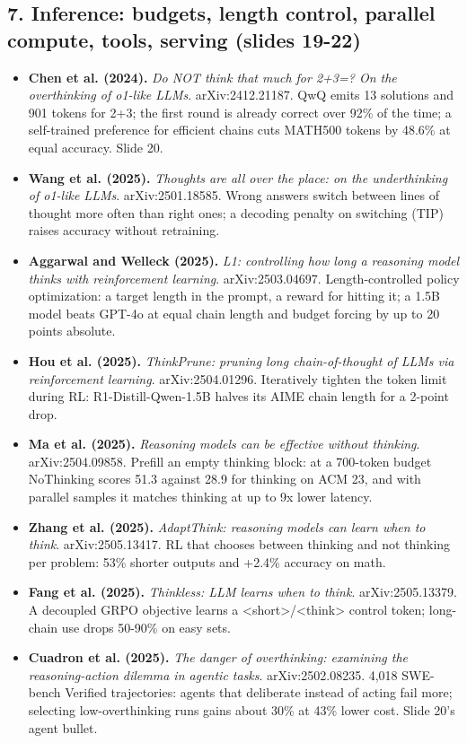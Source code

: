 \documentclass[11pt,letterpaper]{article}
\begin{document}
\subsection*{7. Inference: budgets, length control, parallel compute, tools, serving (slides 19-22)}
\begin{itemize}[leftmargin=1.2em,itemsep=3pt]\sloppy
\item \textbf{Chen et al. (2024).} \textit{Do NOT think that much for 2+3=? On the overthinking of o1-like LLMs}. arXiv:2412.21187. QwQ emits 13 solutions and 901 tokens for 2+3; the first round is already correct over 92\% of the time; a self-trained preference for efficient chains cuts MATH500 tokens by 48.6\% at equal accuracy. Slide 20.
\item \textbf{Wang et al. (2025).} \textit{Thoughts are all over the place: on the underthinking of o1-like LLMs}. arXiv:2501.18585. Wrong answers switch between lines of thought more often than right ones; a decoding penalty on switching (TIP) raises accuracy without retraining.
\item \textbf{Aggarwal and Welleck (2025).} \textit{L1: controlling how long a reasoning model thinks with reinforcement learning}. arXiv:2503.04697. Length-controlled policy optimization: a target length in the prompt, a reward for hitting it; a 1.5B model beats GPT-4o at equal chain length and budget forcing by up to 20 points absolute.
\item \textbf{Hou et al. (2025).} \textit{ThinkPrune: pruning long chain-of-thought of LLMs via reinforcement learning}. arXiv:2504.01296. Iteratively tighten the token limit during RL: R1-Distill-Qwen-1.5B halves its AIME chain length for a 2-point drop.
\item \textbf{Ma et al. (2025).} \textit{Reasoning models can be effective without thinking}. arXiv:2504.09858. Prefill an empty thinking block: at a 700-token budget NoThinking scores 51.3 against 28.9 for thinking on ACM 23, and with parallel samples it matches thinking at up to 9x lower latency.
\item \textbf{Zhang et al. (2025).} \textit{AdaptThink: reasoning models can learn when to think}. arXiv:2505.13417. RL that chooses between thinking and not thinking per problem: 53\% shorter outputs and +2.4\% accuracy on math.
\item \textbf{Fang et al. (2025).} \textit{Thinkless: LLM learns when to think}. arXiv:2505.13379. A decoupled GRPO objective learns a <short>/<think> control token; long-chain use drops 50-90\% on easy sets.
\item \textbf{Cuadron et al. (2025).} \textit{The danger of overthinking: examining the reasoning-action dilemma in agentic tasks}. arXiv:2502.08235. 4,018 SWE-bench Verified trajectories: agents that deliberate instead of acting fail more; selecting low-overthinking runs gains about 30\% at 43\% lower cost. Slide 20's agent bullet.

\end{itemize}
\end{document}
